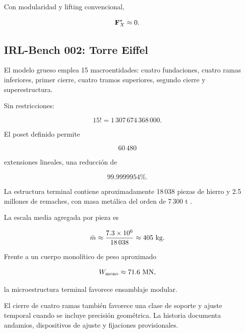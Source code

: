 Con modularidad y lifting convencional,

\begin{equation}
\mathbf F_X^\star\approx0.
\end{equation}

\subsection{IRL-Bench 002: Torre Eiffel}

El modelo grueso emplea 15 macroentidades: cuatro fundaciones, cuatro ramas inferiores, primer cierre, cuatro tramos superiores, segundo cierre y superestructura.

Sin restricciones:

\begin{equation}
15!
=
1\,307\,674\,368\,000.
\end{equation}

El poset definido permite

\begin{equation}
60\,480
\end{equation}

extensiones lineales, una reducción de

\begin{equation}
\boxed{
99.9999954\%.
}
\end{equation}

La estructura terminal contiene aproximadamente 18\,038 piezas de hierro y 2.5 millones de remaches, con masa metálica del orden de 7\,300 t \cite{eiffelhistory,eiffelconstruction,eiffelrapid,eiffelstats}.

La escala media agregada por pieza es

\begin{equation}
\bar m
\approx
\frac{7.3\times10^6}{18\,038}
\approx405\ {\rm kg}.
\end{equation}

Frente a un cuerpo monolítico de peso aproximado

\begin{equation}
W_{\mathrm{mono}}
\approx71.6\ {\rm MN},
\end{equation}

la microestructura terminal favorece ensamblaje modular.

El cierre de cuatro ramas también favorece una clase de soporte y ajuste temporal cuando se incluye precisión geométrica. La historia documenta andamios, dispositivos de ajuste y fijaciones provisionales.

